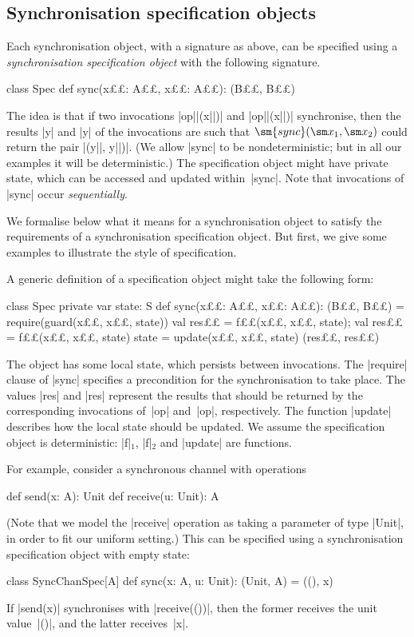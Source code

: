 \subsection{Synchronisation specification objects}

Each synchronisation object, with a signature as above, can be specified using
a \emph{synchronisation specification object} with the following signature.
%
\begin{scala}
class Spec{
  def sync(x££: A££, x££: A££): (B££, B££)
}
\end{scala}
%
The idea is that if two invocations |op||(x||)| and |op||(x||)|
synchronise, then the results |y| and |y| of the invocations are such
that $\sm{sync}(\sm x_1, \sm x_2)$ could return the pair |(y||, y||)|.
(We allow |sync| to be nondeterministic; but in all our examples it will be
deterministic.)  The specification object might have private state, which can
be accessed and updated within~|sync|.  Note that invocations of |sync| occur
\emph{sequentially}.

We formalise below what it means for a synchronisation object to satisfy the
requirements of a synchronisation specification object.  But first, we give
some examples to illustrate the style of specification. 

A generic definition of a specification object might take the following form: 
%
\begin{scala}
class Spec{
  private var state: S
  def sync(x££: A££, x££: A££): (B££, B££) = {
    require(guard(x££, x££, state))
    val res££ = f££(x££, x££, state); val res££ = f££(x££, x££, state)
    state = update(x££, x££, state)
    (res££, res££)
  }
}
\end{scala}
%
The object has some local state, which persists between invocations.  The
|require| clause of |sync| specifies a precondition for the synchronisation to
take place.  The values |res| and |res| represent the results that
should be returned by the corresponding invocations of~|op| and~|op|,
respectively.  The function |update| describes how the local state should be
updated.  We assume the specification object is deterministic: |f|$_1$, |f|$_2$
and |update| are functions. 

For example, consider a synchronous channel with operations
\begin{scala}
def send(x: A): Unit
def receive(u: Unit): A
\end{scala}
%
(Note that we model the |receive| operation as taking a parameter of type
|Unit|, in order to fit our uniform setting.) 
%
This can be specified using a synchronisation specification object
with empty state:
%
\begin{scala}
class SyncChanSpec[A]{
  def sync(x: A, u: Unit): (Unit, A) = ((), x)
}
\end{scala}
%
If |send(x)| synchronises with |receive(())|, then the former receives the
unit value~|()|, and the latter receives~|x|. 

